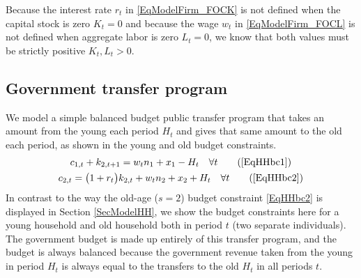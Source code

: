 \documentclass[letterpaper,12pt]{article}
\theoremstyle{definition}
\begin{document}
\begin{spacing}{1.5}
    Because the interest rate $r_t$ in \eqref{EqModelFirm_FOCK} is not defined when the capital stock is zero $K_t=0$ and because the wage $w_t$ in \eqref{EqModelFirm_FOCL} is not defined when aggregate labor is zero $L_t=0$, we know that both values must be strictly positive $K_t, L_t>0$.


  \subsection{Government transfer program}\label{SecModelGovt}

    We model a simple balanced budget public transfer program that takes an amount from the young each period $H_t$ and gives that same amount to the old each period, as shown in the young and old budget constraints.
    \begin{gather}
      c_{1,t} + k_{2,t+1} = w_t n_1 + x_1 - H_t \quad\forall t \tag{\ref{EqHHbc1}} \\
      c_{2,t} = \bigl(1+r_t\bigr)k_{2,t} + w_t n_2 + x_2 + H_t \quad\forall t \tag{\ref{EqHHbc2}}
    \end{gather}
    In contrast to the way the old-age ($s=2$) budget constraint \eqref{EqHHbc2} is displayed in Section \ref{SecModelHH}, we show the budget constraints here for a young household and old household both in period $t$ (two separate individuals). The government budget is made up entirely of this transfer program, and the budget is always balanced because the government revenue taken from the young in period $H_t$ is always equal to the transfers to the old $H_t$ in all periods $t$.


\end{spacing}
\end{document}
